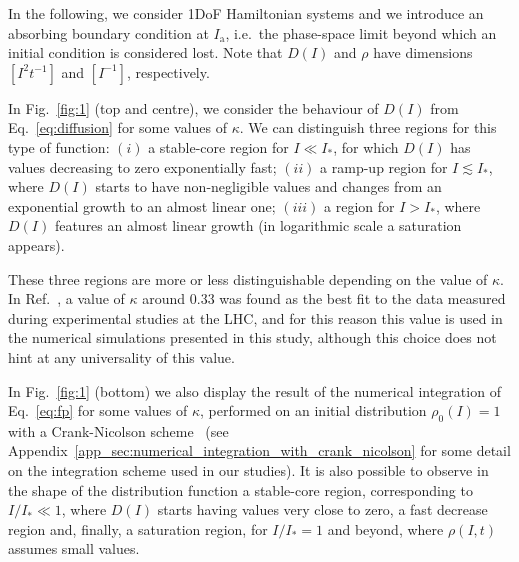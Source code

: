 In the following, we consider 1DoF Hamiltonian systems and we introduce an absorbing boundary condition at $I_{\mathrm{a}}$, i.e.\ the phase-space limit beyond which an initial condition is considered lost. Note that $D(I)$ and $\rho$ have dimensions $[I^2t^{-1}]$ and $[I^{-1}]$, respectively.

In Fig.~\ref{fig:1} (top and centre), we consider the behaviour of $D(I)$ from Eq.~\eqref{eq:diffusion} for some values of $\kappa$. We can distinguish three regions for this type of function: $(i)$ a stable-core region for $I \ll I_\ast$, for which $D(I)$ has values decreasing to zero exponentially fast; $(ii)$ a ramp-up region for $I \lesssim I_\ast$, where $D(I)$ starts to have non-negligible values and changes from an exponential growth to an almost linear one; $(iii)$ a region for $I >  I_\ast$, where $D(I)$ features an almost linear growth (in logarithmic scale a saturation appears).

These three regions are more or less distinguishable depending on the value of $\kappa$. In Ref.~\cite{bazzani2020diffusion}, a value of $\kappa$ around $0.33$ was found as the best fit to the data measured during experimental studies at the LHC, and for this reason this value is used in the numerical simulations presented in this study, {although this choice does not hint at any universality of this value.}

In Fig.~\ref{fig:1} (bottom) we also display the result of the numerical integration of Eq.~\eqref{eq:fp} for some values of $\kappa$, performed on an initial distribution $\rho_0(I)=1$ with a Crank-Nicolson scheme~\cite{crank1947practical} (see Appendix~\ref{app_sec:numerical_integration_with_crank_nicolson} for some detail on the integration scheme used in our studies).
It is also possible to observe in the shape of the distribution function a stable-core region, corresponding to $I/I_\ast \ll 1$, where $D(I)$ starts having values very close to zero, a fast decrease region and, finally, a saturation region, for $I/I_\ast = 1$ and beyond, where $\rho(I, t)$ assumes small values.

